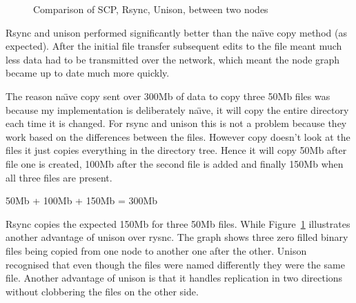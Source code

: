 \documentclass[12pt]{article}
\begin{document}
\begin{figure}[htp]
    \caption{Comparison of SCP, Rsync, Unison, between two nodes}
    \label{fig:point_comp_graph}
\end{figure}

Rsync and unison performed significantly better
than the na\"{\i}ve copy method (as expected). After the initial file
transfer subsequent edits to the file meant much less data had to
be transmitted over the network, which meant the node graph
became up to date much more quickly.

The reason na\"{\i}ve copy sent over 300Mb of data to copy three 50Mb
files was because my implementation is deliberately na\"{\i}ve, it will
copy the entire directory each time it is changed. For rsync and
unison this is not a problem because they work based on the
differences between the files. However copy doesn't look at
the files it just copies everything in the directory tree.
Hence it will copy 50Mb after file one is created, 100Mb after
the second file is added and finally 150Mb when all three
files are present.

50Mb + 100Mb + 150Mb = 300Mb

Rsync copies the expected 150Mb for three 50Mb files. While
Figure~\ref{fig:point_comp_graph} illustrates another advantage
of unison over rysnc. The graph shows three zero filled
binary files being copied from one node to another one after
the other. Unison recognised that even though the files were named
differently they were the same file. Another advantage of unison
is that it handles replication in two directions without
clobbering the files on the other side.
\end{document}
